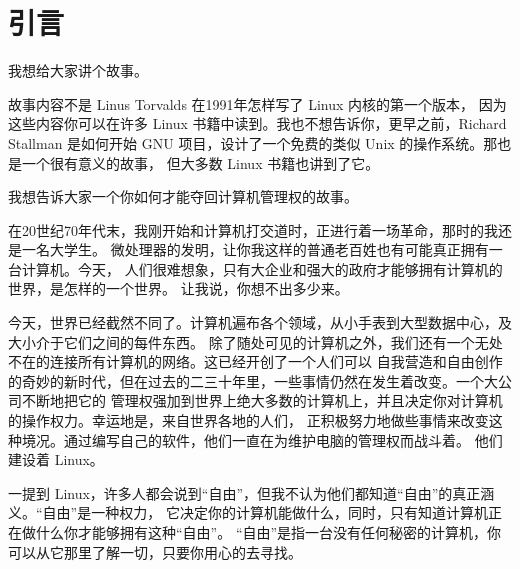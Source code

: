 \renewcommand\chapterillustration{cherry-tomatos.jpg}
\chapter{引言}
\label{引言}


我想给大家讲个故事。

\par 故事内容不是 Linus Torvalds 在1991年怎样写了 Linux 内核的第一个版本， 因为这些内容你可以在许多 Linux 书籍中读到。我也不想告诉你，更早之前，Richard Stallman 是如何开始 GNU 项目，设计了一个免费的类似 Unix 的操作系统。那也是一个很有意义的故事， 但大多数 Linux 书籍也讲到了它。

\par 我想告诉大家一个你如何才能夺回计算机管理权的故事。

\par 在20世纪70年代末，我刚开始和计算机打交道时，正进行着一场革命，那时的我还是一名大学生。 微处理器的发明，让你我这样的普通老百姓也有可能真正拥有一台计算机。今天， 人们很难想象，只有大企业和强大的政府才能够拥有计算机的世界，是怎样的一个世界。 让我说，你想不出多少来。

\par 今天，世界已经截然不同了。计算机遍布各个领域，从小手表到大型数据中心，及大小介于它们之间的每件东西。 除了随处可见的计算机之外，我们还有一个无处不在的连接所有计算机的网络。这已经开创了一个人们可以 自我营造和自由创作的奇妙的新时代，但在过去的二三十年里，一些事情仍然在发生着改变。一个大公司不断地把它的 管理权强加到世界上绝大多数的计算机上，并且决定你对计算机的操作权力。幸运地是，来自世界各地的人们， 正积极努力地做些事情来改变这种境况。通过编写自己的软件，他们一直在为维护电脑的管理权而战斗着。 他们建设着 Linux。

\par 一提到 Linux，许多人都会说到“自由”，但我不认为他们都知道“自由”的真正涵义。“自由”是一种权力， 它决定你的计算机能做什么，同时，只有知道计算机正在做什么你才能够拥有这种“自由”。 “自由”是指一台没有任何秘密的计算机，你可以从它那里了解一切，只要你用心的去寻找。












